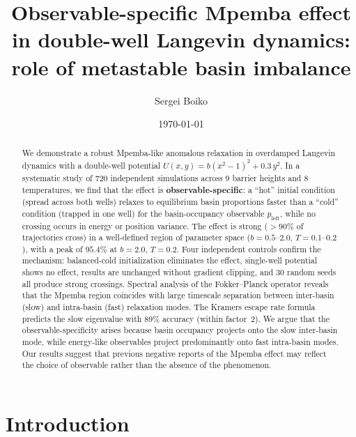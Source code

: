 \documentclass[aps,pre,reprint,superscriptaddress,showpacs]{revtex4-2}
\begin{document}
\title{Observable-specific Mpemba effect in double-well Langevin dynamics:\\
role of metastable basin imbalance}

\author{Sergei Boiko}

\date{\today}

\begin{abstract}
We demonstrate a robust Mpemba-like anomalous relaxation in overdamped Langevin
dynamics with a double-well potential $U(x,y) = b(x^2 - 1)^2 + 0.3\,y^2$. In a
systematic study of 720 independent simulations across 9 barrier heights and 8
temperatures, we find that the effect is \textbf{observable-specific}: a ``hot''
initial condition (spread across both wells) relaxes to equilibrium basin
proportions faster than a ``cold'' condition (trapped in one well) for the
basin-occupancy observable $p_\mathrm{left}$, while no crossing occurs in energy or
position variance. The effect is strong ($>90\%$ of trajectories cross) in a
well-defined region of parameter space ($b = 0.5$--$2.0$, $T = 0.1$--$0.2$),
with a peak of $95.4\%$ at $b = 2.0$, $T = 0.2$. Four independent controls
confirm the mechanism: balanced-cold initialization eliminates the effect,
single-well potential shows no effect, results are unchanged without gradient
clipping, and 30 random seeds all produce strong crossings. Spectral analysis
of the Fokker--Planck operator reveals that the Mpemba region coincides with
large timescale separation between inter-basin (slow) and intra-basin (fast)
relaxation modes. The Kramers escape rate formula predicts the slow eigenvalue
with 89\% accuracy (within factor~2). We argue that the observable-specificity
arises because basin occupancy projects onto the slow inter-basin mode, while
energy-like observables project predominantly onto fast intra-basin modes. Our
results suggest that previous negative reports of the Mpemba effect may reflect
the choice of observable rather than the absence of the phenomenon.
\end{abstract}

\maketitle

\section{Introduction}
\end{document}
